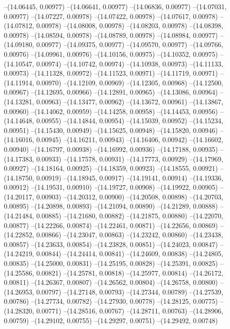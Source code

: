 --(14.06445, 0.00977)
--(14.06641, 0.00977)
--(14.06836, 0.00977)
--(14.07031, 0.00977)
--(14.07227, 0.00978)
--(14.07422, 0.00978)
--(14.07617, 0.00978)
--(14.07812, 0.00978)
--(14.08008, 0.00978)
--(14.08203, 0.00978)
--(14.08398, 0.00978)
--(14.08594, 0.00978)
--(14.08789, 0.00978)
--(14.08984, 0.00977)
--(14.09180, 0.00977)
--(14.09375, 0.00977)
--(14.09570, 0.00977)
--(14.09766, 0.00976)
--(14.09961, 0.00976)
--(14.10156, 0.00975)
--(14.10352, 0.00975)
--(14.10547, 0.00974)
--(14.10742, 0.00974)
--(14.10938, 0.00973)
--(14.11133, 0.00973)
--(14.11328, 0.00972)
--(14.11523, 0.00971)
--(14.11719, 0.00971)
--(14.11914, 0.00970)
--(14.12109, 0.00969)
--(14.12305, 0.00968)
--(14.12500, 0.00967)
--(14.12695, 0.00966)
--(14.12891, 0.00965)
--(14.13086, 0.00964)
--(14.13281, 0.00963)
--(14.13477, 0.00962)
--(14.13672, 0.00961)
--(14.13867, 0.00960)
--(14.14062, 0.00959)
--(14.14258, 0.00958)
--(14.14453, 0.00956)
--(14.14648, 0.00955)
--(14.14844, 0.00954)
--(14.15039, 0.00952)
--(14.15234, 0.00951)
--(14.15430, 0.00949)
--(14.15625, 0.00948)
--(14.15820, 0.00946)
--(14.16016, 0.00945)
--(14.16211, 0.00943)
--(14.16406, 0.00942)
--(14.16602, 0.00940)
--(14.16797, 0.00938)
--(14.16992, 0.00936)
--(14.17188, 0.00935)
--(14.17383, 0.00933)
--(14.17578, 0.00931)
--(14.17773, 0.00929)
--(14.17969, 0.00927)
--(14.18164, 0.00925)
--(14.18359, 0.00923)
--(14.18555, 0.00921)
--(14.18750, 0.00919)
--(14.18945, 0.00917)
--(14.19141, 0.00914)
--(14.19336, 0.00912)
--(14.19531, 0.00910)
--(14.19727, 0.00908)
--(14.19922, 0.00905)
--(14.20117, 0.00903)
--(14.20312, 0.00900)
--(14.20508, 0.00898)
--(14.20703, 0.00895)
--(14.20898, 0.00893)
--(14.21094, 0.00890)
--(14.21289, 0.00888)
--(14.21484, 0.00885)
--(14.21680, 0.00882)
--(14.21875, 0.00880)
--(14.22070, 0.00877)
--(14.22266, 0.00874)
--(14.22461, 0.00871)
--(14.22656, 0.00869)
--(14.22852, 0.00866)
--(14.23047, 0.00863)
--(14.23242, 0.00860)
--(14.23438, 0.00857)
--(14.23633, 0.00854)
--(14.23828, 0.00851)
--(14.24023, 0.00847)
--(14.24219, 0.00844)
--(14.24414, 0.00841)
--(14.24609, 0.00838)
--(14.24805, 0.00835)
--(14.25000, 0.00831)
--(14.25195, 0.00828)
--(14.25391, 0.00825)
--(14.25586, 0.00821)
--(14.25781, 0.00818)
--(14.25977, 0.00814)
--(14.26172, 0.00811)
--(14.26367, 0.00807)
--(14.26562, 0.00804)
--(14.26758, 0.00800)
--(14.26953, 0.00797)
--(14.27148, 0.00793)
--(14.27344, 0.00789)
--(14.27539, 0.00786)
--(14.27734, 0.00782)
--(14.27930, 0.00778)
--(14.28125, 0.00775)
--(14.28320, 0.00771)
--(14.28516, 0.00767)
--(14.28711, 0.00763)
--(14.28906, 0.00759)
--(14.29102, 0.00755)
--(14.29297, 0.00751)
--(14.29492, 0.00748)
